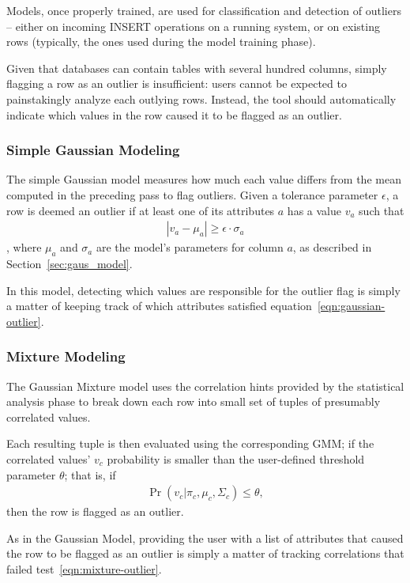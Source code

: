Models, once properly trained, are used for classification and detection of outliers -- either on incoming INSERT operations on a running system, or on existing rows (typically, the ones used during the model training phase). %

Given that databases can contain tables with several hundred columns, simply flagging a row as an outlier is insufficient: users cannot be expected to painstakingly analyze each outlying rows. Instead, the tool should automatically indicate which values in the row caused it to be flagged as an outlier.

\subsubsection{Simple Gaussian Modeling}
The simple Gaussian model measures how much each value differs from the mean computed in the preceding pass to flag outliers. Given a tolerance parameter $\epsilon$, a row is deemed an outlier if at least one of its attributes $a$ has a value $v_a$ such that 
\begin{align}
  |v_a - \mu_a| \ge \epsilon \cdot \sigma_a
  \label{eqn:gaussian-outlier}
\end{align}
, where $\mu_a$ and $\sigma_a$ are the model's parameters for column $a$, as described in Section~\ref{sec:gaus_model}.

In this model, detecting which values are responsible for the outlier flag is simply a matter of keeping track of which attributes satisfied equation~\ref{eqn:gaussian-outlier}.
 
\subsubsection{Mixture Modeling}
The Gaussian Mixture model uses the correlation hints provided by the statistical analysis phase to break down each row into small set of tuples of presumably correlated values.

Each resulting tuple is then evaluated using the corresponding GMM; if the correlated values' $v_c$ probability is smaller than the user-defined threshold parameter $\theta$; that is, if
\begin{align}
  \Pr(v_c | \pi_c, \mu_c, \Sigma_c) \leq \theta, 
  \label{eqn:mixture-outlier}
\end{align}
then the row is flagged as an outlier.

As in the Gaussian Model, providing the user with a list of attributes that caused the row to be flagged as an outlier is simply a matter of tracking correlations that failed test~\ref{eqn:mixture-outlier}.

